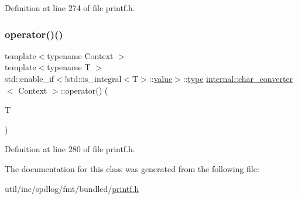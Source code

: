 Definition at line 274 of file printf.\+h.

\mbox{\label{classinternal_1_1char__converter_a7ae1a2c3d88d71ef1618d34d5a47a184}} 
\subsubsection{\texorpdfstring{operator()()}{operator()()}\hspace{0.1cm}{\footnotesize\ttfamily [2/2]}}
{\footnotesize\ttfamily template$<$typename Context $>$ \\
template$<$typename T $>$ \\
std\+::enable\+\_\+if$<$!std\+::is\+\_\+integral$<$T$>$\+::\hyperlink{classinternal_1_1value}{value}$>$\+::\hyperlink{namespaceinternal_a8661864098ac0acff9a6dd7e66f59038}{type} \hyperlink{classinternal_1_1char__converter}{internal\+::char\+\_\+converter}$<$ Context $>$\+::operator() (\begin{DoxyParamCaption}\item[{T}]{ }\end{DoxyParamCaption})\hspace{0.3cm}{\ttfamily [inline]}}



Definition at line 280 of file printf.\+h.



The documentation for this class was generated from the following file\+:\begin{DoxyCompactItemize}
\item 
util/inc/spdlog/fmt/bundled/\hyperlink{printf_8h}{printf.\+h}\end{DoxyCompactItemize}

